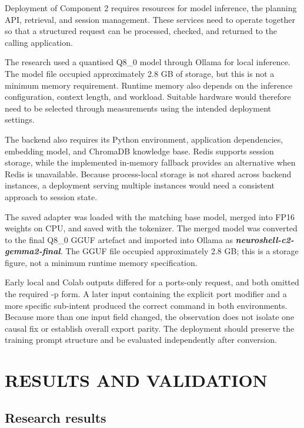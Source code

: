 \documentclass[
]{article}
\begin{document}
Deployment of Component 2 requires resources for model inference, the
planning API, retrieval, and session management. These services need to
operate together so that a structured request can be processed, checked,
and returned to the calling application.

The research used a quantised Q8\_0 model through Ollama for local
inference. The model file occupied approximately 2.8 GB of storage, but
this is not a minimum memory requirement. Runtime memory also depends on
the inference configuration, context length, and workload. Suitable
hardware would therefore need to be selected through measurements using
the intended deployment settings.

The backend also requires its Python environment, application
dependencies, embedding model, and ChromaDB knowledge base. Redis
supports session storage, while the implemented in-memory fallback
provides an alternative when Redis is unavailable. Because process-local
storage is not shared across backend instances, a deployment serving
multiple instances would need a consistent approach to session state.

The saved adapter was loaded with the matching base model, merged into
FP16 weights on CPU, and saved with the tokenizer. The merged model was
converted to the final Q8\_0 GGUF artefact and imported into Ollama as
\emph{\textbf{neuroshell-c2-gemma2-final}}. The GGUF file occupied
approximately 2.8 GB; this is a storage figure, not a minimum runtime
memory specification.

Early local and Colab outputs differed for a ports-only request, and
both omitted the required -p form. A later input containing the explicit
port modifier and a more specific sub-intent produced the correct
command in both environments. Because more than one input field changed,
the observation does not isolate one causal fix or establish overall
export parity. The deployment should preserve the training prompt
structure and be evaluated independently after conversion.

\hypertarget{results-and-validation}{%
\section{\texorpdfstring{ RESULTS AND
VALIDATION}{ RESULTS AND VALIDATION}}\label{results-and-validation}}

\hypertarget{research-results}{%
\subsection{Research results}\label{research-results}}
\end{document}
